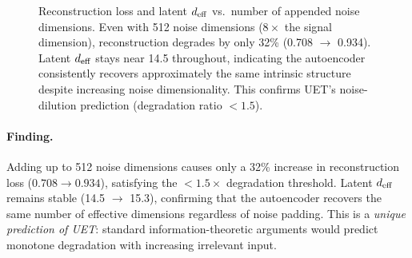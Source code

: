 \begin{figure}[H]
\centering
{}
\caption{Reconstruction loss and latent $d_{\mathrm{eff}}$ vs.\ number of appended noise
dimensions. Even with 512 noise dimensions ($8\times$ the signal dimension),
reconstruction degrades by only 32\% (0.708 $\to$ 0.934).
Latent $d_{\mathrm{eff}}$ stays near 14.5 throughout, indicating the autoencoder
consistently recovers approximately the same intrinsic structure
despite increasing noise dimensionality.
This confirms UET's noise-dilution prediction (degradation ratio $< 1.5$).}
\label{fig:noise-dim}
\end{figure}

\paragraph{Finding.}
Adding up to 512 noise dimensions causes only a 32\% increase in reconstruction
loss ($0.708 \to 0.934$), satisfying the $< 1.5\times$ degradation threshold.
Latent $d_{\mathrm{eff}}$ remains stable (14.5 $\to$ 15.3), confirming that the autoencoder
recovers the same number of effective dimensions regardless of noise padding.
This is a \emph{unique prediction of UET}: standard information-theoretic
arguments would predict monotone degradation with increasing irrelevant input.

